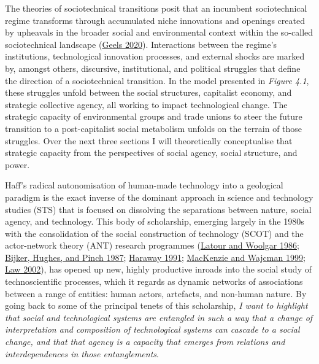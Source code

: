 \documentclass[a4paper, nobind]{templates/ociamthesis}
\begin{document}
The theories of sociotechnical transitions posit that an incumbent sociotechnical regime transforms through accumulated niche innovations and openings created by upheavals in the broader social and environmental context within the so-called sociotechnical landscape (\protect\hyperlink{ref-geels_micro-foundations_2020}{Geels 2020}). Interactions between the regime's institutions, technological innovation processes, and external shocks are marked by, amongst others, discursive, institutional, and political struggles that define the direction of a sociotechnical transition. In the model presented in \emph{Figure 4.1}, these struggles unfold between the social structures, capitalist economy, and strategic collective agency, all working to impact technological change. The strategic capacity of environmental groups and trade unions to steer the future transition to a post-capitalist social metabolism unfolds on the terrain of those struggles. Over the next three sections I will theoretically conceptualise that strategic capacity from the perspectives of social agency, social structure, and power.

Haff's radical autonomisation of human-made technology into a geological paradigm is the exact inverse of the dominant approach in science and technology studies (STS) that is focused on dissolving the separations between nature, social agency, and technology. This body of scholarship, emerging largely in the 1980s with the consolidation of the social construction of technology (SCOT) and the actor-network theory (ANT) research programmes (\protect\hyperlink{ref-latour_laboratory_1986}{Latour and Woolgar 1986}; \protect\hyperlink{ref-bijker_social_1987}{Bijker, Hughes, and Pinch 1987}; \protect\hyperlink{ref-haraway_simians_1991}{Haraway 1991}; \protect\hyperlink{ref-mackenzie_social_1999}{MacKenzie and Wajcman 1999}; \protect\hyperlink{ref-law_aircraft_2002}{Law 2002}), has opened up new, highly productive inroads into the social study of technoscientific processes, which it regards as dynamic networks of associations between a range of entities: human actors, artefacts, and non-human nature. By going back to some of the principal tenets of this scholarship, \emph{I want to highlight that social and technological systems are entangled in such a way that a change of interpretation and composition of technological systems can cascade to a social change, and that that agency is a capacity that emerges from relations and interdependences in those entanglements}.
\end{document}
